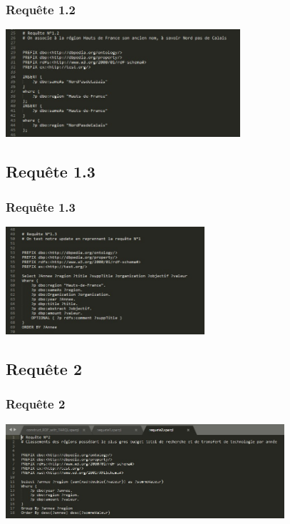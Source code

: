 \documentclass[12pt]{beamer}
\begin{document}
			\begin{frame}
				
				\frametitle{Requête 1.2}
				
				\centering\includegraphics[height=4cm]{picture/requete12.jpg}
					
			\end{frame}	
			

		\subsection{Requête 1.3}
		
			\begin{frame}
				
				\frametitle{Requête 1.3}
				
				\centering\includegraphics[height=4cm]{picture/requete13.jpg}
					
			\end{frame}	
			
							
		\subsection{Requête 2}
		
			\begin{frame}
				
				\frametitle{Requête 2}
				
				\centering\includegraphics[height=3.5cm]{picture/requete2.jpg}
								
			\end{frame}				
										
\end{document}
